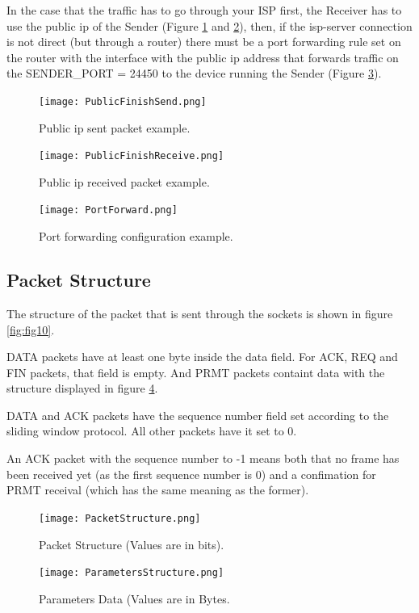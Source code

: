 \documentclass[12pt]{article}
\begin{document}
In the case that the traffic has to go through your ISP first, the Receiver has to use the public ip of the Sender (Figure \ref{fig:fig7} and \ref{fig:fig8}), then, if the isp-server connection is not direct (but through a router) there must be a port forwarding rule set on the router with the interface with the public ip address that forwards traffic on the SENDER\_PORT = 24450 to the device running the Sender (Figure \ref{fig:fig9}).

\begin{figure}[!htb]
	\centering
	\texttt{[image: PublicFinishSend.png]}
	\caption{Public ip sent packet example.}\label{fig:fig7}
\end{figure}
\begin{figure}[!htb]
	\centering
	\texttt{[image: PublicFinishReceive.png]}
	\caption{Public ip received packet example.}\label{fig:fig8}
\end{figure}
\begin{figure}[!htb]
	\centering
	\texttt{[image: PortForward.png]}
	\caption{Port forwarding configuration example.}\label{fig:fig9}
\end{figure}

\subsection{Packet Structure}

The structure of the packet that is sent through the sockets is shown in figure \ref{fig:fig10}.

DATA packets have at least one byte inside the data field. For ACK, REQ and FIN packets, that field is empty. And PRMT packets containt data with the structure displayed in figure \ref{fig:fig11}.

DATA and ACK packets have the sequence number field set according to the sliding window protocol. All other packets have it set to 0.

An ACK packet with the sequence number to -1 means both that no frame has been received yet (as the first sequence number is 0) and a confimation for PRMT receival (which has the same meaning as the former).

\begin{figure}[!htb]
	\begin{minipage}{0.48\textwidth}
		\centering
		\texttt{[image: PacketStructure.png]}
		\caption{Packet Structure (Values are in bits).}\label{fig:fig10}
	\end{minipage}\hfill
	\begin{minipage}{0.48\textwidth}
		\centering
		\texttt{[image: ParametersStructure.png]}
		\caption{Parameters Data (Values are in Bytes.}\label{fig:fig11}
	\end{minipage}\hfill
\end{figure}
\end{document}
